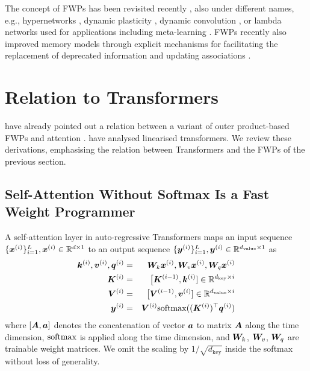 \documentclass{article}
\theoremstyle{definition}
\begin{document}
The concept of FWPs has been
revisited recently  \citep{ba2016using, schlag2017gated},
also under different names, e.g.,
 hypernetworks \citep{ha2017hypernetworks, perez2018film, galanti2020hyper},
dynamic plasticity \citep{pmlr-v80-miconi18a, miconi2018backpropamine}, dynamic convolution
\citep{KleinWA15, noh2016image, NIPS2016_8bf1211f}, or lambda networks \citep{bello2021lambdanetworks}
used for applications including meta-learning \citep{munkhdalai2017meta, munkhdalai2018metalearning, MunkhdalaiSWT19, kirsch2020meta}.
FWPs recently also improved memory models
through explicit
mechanisms for facilitating the replacement of deprecated information 
and updating associations \citep{schlag2018learning, schlag2020fastweightmemory}.

\section{Relation to Transformers}
\label{sec:relation_to_transformers}
 \citet{ba2016using} 
have already pointed out a relation between a variant of outer product-based FWPs \citep{schmidhuber1993reducing} and attention \citep{bahdanau2014neural}. \citet{katharopoulos2020transformers} have analysed linearised transformers.
We review these derivations, emphasising the relation between Transformers and the FWPs of the previous section.

\subsection{Self-Attention Without Softmax Is a Fast Weight Programmer}
\label{sec:no_softmax}
A self-attention layer in auto-regressive Transformers \cite{trafo}
maps an input sequence $\{ {\bm{x}}^{(i)} \}_{i=1}^L, {\bm{x}}^{(i)} \in \mathbb{R}^{d \times1}$
to an output sequence $\{ {\bm{y}}^{(i)} \}_{i=1}^L, {\bm{y}}^{(i)} \in \mathbb{R}^{d_\text{value}\times1}$ as
\begin{eqnarray}
{\bm{k}}^{(i)}, {\bm{v}}^{(i)}, {\bm{q}}^{(i)} &=& {\bm{W}}_k {\bm{x}}^{(i)}, {\bm{W}}_v {\bm{x}}^{(i)}, {\bm{W}}_q {\bm{x}}^{(i)} \label{eq:proj} \\
{\bm{K}}^{(i)} &=& \big[{\bm{K}}^{(i-1)}, {\bm{k}}^{(i)}] \in \mathbb{R}^{d_\text{key} \times i} \\
{\bm{V}}^{(i)}  &=& \big[{\bm{V}}^{(i-1)} , {\bm{v}}^{(i)} ] \in \mathbb{R}^{d_\text{value} \times i} \\
{\bm{y}}^{(i)} &=& {\bm{V}}^{(i)} \mathrm{softmax}(({\bm{K}}^{(i)})^{\top} {\bm{q}}^{(i)}) \label{eq:trafo_softmax}
\end{eqnarray}
where $[{\bm{A}}, {\bm{a}}]$ denotes the concatenation of vector ${\bm{a}}$ to matrix ${\bm{A}}$ along the time dimension,
$\mathrm{softmax}$ is applied along the time dimension,
and ${\bm{W}}_k$, ${\bm{W}}_v$, ${\bm{W}}_q$ are trainable weight matrices.
We omit the scaling by $1/\sqrt{d_\text{key}}$ inside the softmax without loss of generality.
\end{document}
